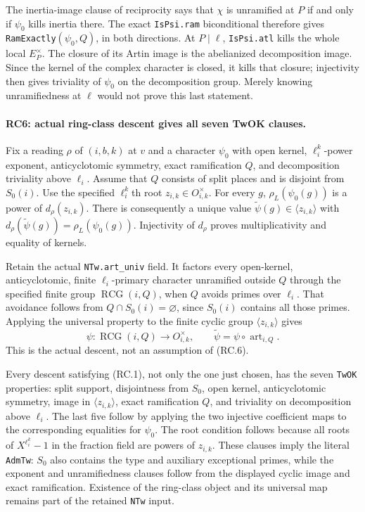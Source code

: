 The inertia-image clause of reciprocity says that $\chi$ is unramified
at $P$ if and only if $\psi_0$ kills inertia there. The exact
\texttt{IsPsi.ram} biconditional therefore gives
\texttt{RamExactly}$(\psi_0,Q)$, in both directions.
At $P\mid\ell$, \texttt{IsPsi.atl} kills the whole local
$E_P^\times$. The closure of its Artin image is the abelianized
decomposition image. Since the kernel of the complex character is
closed, it kills that closure; injectivity then gives triviality of
$\psi_0$ on the decomposition group. Merely knowing unramifiedness at
$\ell$ would not prove this last statement.

\paragraph{RC6: actual ring-class descent gives all seven TwOK clauses.}
Fix a reading $\rho$ of $(i,b,k)$ at $v$ and a character $\psi_0$ with
open kernel, $\ell_i^k$-power exponent, anticyclotomic symmetry, exact
ramification $Q$, and decomposition triviality above $\ell_i$.
Assume that $Q$ consists of split places and is disjoint from $S_0(i)$.
Use the specified $\ell_i^k$th root $z_{i,k}\in O_{i,k}^\times$.
For every $g$, $\rho_L(\psi_0(g))$ is a power of $d_\rho(z_{i,k})$.
There is consequently a unique value
$\widetilde\psi(g)\in\langle z_{i,k}\rangle$ with
$d_\rho(\widetilde\psi(g))=\rho_L(\psi_0(g))$.
Injectivity of $d_\rho$ proves multiplicativity and equality of kernels.

Retain the actual \texttt{NTw.art\_univ} field. It factors every
open-kernel, anticyclotomic, finite $\ell_i$-primary character unramified
outside $Q$ through the specified finite group
$\operatorname{RCG}(i,Q)$, when $Q$ avoids primes over $\ell_i$.
That avoidance follows from $Q\cap S_0(i)=\varnothing$, since $S_0(i)$
contains all those primes. Applying the universal property to the finite
cyclic group $\langle z_{i,k}\rangle$ gives
\[
 \psi:\operatorname{RCG}(i,Q)\to O_{i,k}^{\times},
 \qquad \widetilde\psi=\psi\circ\operatorname{art}_{i,Q}.
                                                               \tag{RC.6}
\]
This is the actual descent, not an assumption of (RC.6).

Every descent satisfying (RC.1), not only the one just chosen, has the
seven \texttt{TwOK} properties: split support, disjointness from $S_0$,
open kernel, anticyclotomic symmetry, image in
$\langle z_{i,k}\rangle$, exact ramification $Q$, and triviality on
decomposition above $\ell_i$. The last five follow by applying the two
injective coefficient maps to the corresponding equalities for $\psi_0$.
The root condition follows because all roots of $X^{\ell_i^k}-1$ in
the fraction field are powers of $z_{i,k}$. These clauses imply the
literal \texttt{AdmTw}: $S_0$ also contains the type and auxiliary
exceptional primes, while the exponent and unramifiedness clauses follow
from the displayed cyclic image and exact ramification.
Existence of the ring-class object and its universal map remains part
of the retained \texttt{NTw} input.

